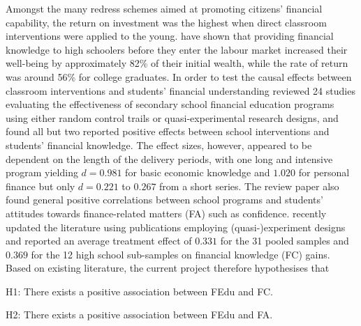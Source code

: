 \documentclass[a4paper,11pt,UKenglish,twoside,openright]{report}\usepackage[]{graphicx}\usepackage[]{color}
\begin{document}
Amongst the many redress schemes aimed at promoting citizens' financial capability, the return on investment was the highest when direct classroom interventions were applied to the young. \textcite{lusardi:2014} have shown that providing financial knowledge to high schoolers before they enter the labour market increased their well-being by approximately 82\% of their initial wealth, while the rate of return was around 56\% for college graduates. In order to test the causal effects between classroom interventions and students' financial understanding \textcite{amagir:2018} reviewed 24 studies evaluating the effectiveness of secondary school financial education programs using either random control trails or quasi-experimental research designs, and found all but two reported positive effects between school interventions and students' financial knowledge. The effect sizes, however, appeared to be dependent on the length of the delivery periods, with one long and intensive program yielding $d=0.981$ for basic economic knowledge and $1.020$ for personal finance but only $d=0.221$ to $0.267$ from a short series. The review paper also found general positive correlations between school programs and students' attitudes towards finance-related matters (FA) such as confidence. \textcite{kaiser:2020} recently updated the literature using publications employing (quasi-)experiment designs and reported an average treatment effect of $0.331$ for the 31 pooled samples and $0.369$ for the 12 high school sub-samples on financial knowledge (FC) gains. Based on existing literature, the current project therefore hypothesises that
\begin{hyth}
    \item[H1:] There exists a positive association between FEdu and FC.
    \item[H2:] There exists a positive association between FEdu and FA.
\end{hyth}
\end{document}
